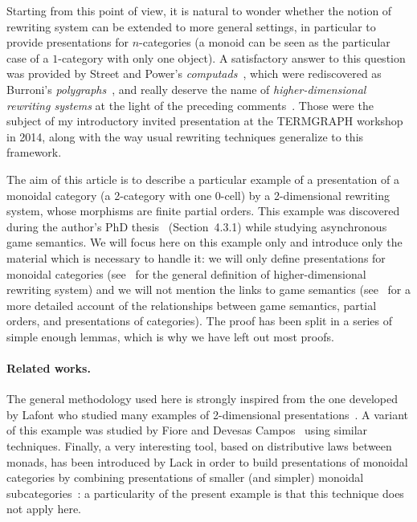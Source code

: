 \documentclass[submission,copyright,creativecommons]{eptcs}
\theoremstyle{definition}
\theoremstyle{remark}
\begin{document}
Starting from this point of view, it is natural to wonder whether the notion of
rewriting system can be extended to more general settings, in particular to
provide presentations for $n$-categories (a monoid can be seen as the particular
case of a $1$-category with only one object). A satisfactory answer to this
question was provided by Street and Power's
\emph{computads}~\cite{street1976limits,power1991n}, which were rediscovered as
Burroni's \emph{polygraphs}~\cite{burroni1993higher}, and really deserve the
name of \emph{higher-dimensional rewriting systems} at the light of the
preceding comments~\cite{mimram:trt}. Those were the subject of my introductory
invited presentation at the TERMGRAPH workshop in 2014, along with the way usual
rewriting techniques generalize to this framework.

The aim of this article is to describe a particular example of a presentation of
a monoidal category (\ie a 2-category with one 0-cell) by a 2-dimensional
rewriting system, whose morphisms are finite partial orders. This example was
discovered during the author's PhD thesis~\cite{mimram:phd} (Section~4.3.1)
while studying asynchronous game semantics. We will focus here on this example
only and introduce only the material which is necessary to handle it: we will
only define presentations for monoidal categories (see~\cite{burroni1993higher}
for the general definition of higher-dimensional rewriting system) and we will
not mention the links to game semantics
(see~\cite{mimram:phd,mellies2007asynchronous,mimram2011structure} for a more
detailed account of the relationships between game semantics, partial orders,
and presentations of categories). The proof has been split in a series of simple
enough lemmas, which is why we have left out most proofs.

\paragraph{Related works.}
The general methodology used here is strongly inspired from the one developed by
Lafont who studied many examples of 2-dimensional
presentations~\cite{lafont2003towards}. A variant of this example was studied by
Fiore and Devesas Campos~\cite{fiore2013algebra} using similar
techniques. Finally, a very interesting tool, based on distributive laws between
monads, has been introduced by Lack in order to build presentations of monoidal
categories by combining presentations of smaller (and simpler) monoidal
subcategories~\cite{lack2004composing}: a particularity of the present example
is that this technique does not apply here.
\end{document}
